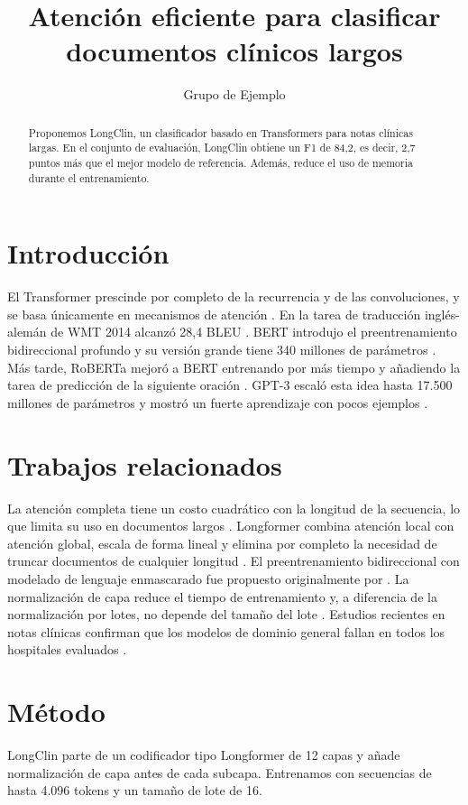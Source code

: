 \documentclass{article}
\title{Atención eficiente para clasificar documentos clínicos largos}
\author{Grupo de Ejemplo}
\begin{document}
\maketitle

\begin{abstract}
Proponemos LongClin, un clasificador basado en Transformers para notas clínicas largas.
En el conjunto de evaluación, LongClin obtiene un F1 de 84,2, es decir, 2,7 puntos más que el mejor modelo de referencia.
Además, reduce el uso de memoria durante el entrenamiento.
\end{abstract}

\section{Introducción}
El Transformer prescinde por completo de la recurrencia y de las convoluciones, y se basa únicamente en mecanismos de atención \cite{vaswani2017}.
En la tarea de traducción inglés-alemán de WMT 2014 alcanzó 28,4 BLEU \cite{vaswani2017}.
BERT introdujo el preentrenamiento bidireccional profundo y su versión grande tiene 340 millones de parámetros \cite{devlin2019}.
Más tarde, RoBERTa mejoró a BERT entrenando por más tiempo y añadiendo la tarea de predicción de la siguiente oración \cite{liu2019}.
GPT-3 escaló esta idea hasta 17.500 millones de parámetros y mostró un fuerte aprendizaje con pocos ejemplos \cite{brown2020}.

\section{Trabajos relacionados}
La atención completa tiene un costo cuadrático con la longitud de la secuencia, lo que limita su uso en documentos largos \cite{beltagy2020}.
Longformer combina atención local con atención global, escala de forma lineal y elimina por completo la necesidad de truncar documentos de cualquier longitud \cite{beltagy2020}.
El preentrenamiento bidireccional con modelado de lenguaje enmascarado fue propuesto originalmente por \cite{vaswani2017}.
La normalización de capa reduce el tiempo de entrenamiento y, a diferencia de la normalización por lotes, no depende del tamaño del lote \cite{ba2016}.
Estudios recientes en notas clínicas confirman que los modelos de dominio general fallan en todos los hospitales evaluados \cite{gomez2023}.

\section{Método}
LongClin parte de un codificador tipo Longformer de 12 capas y añade normalización de capa antes de cada subcapa.
Entrenamos con secuencias de hasta 4.096 tokens y un tamaño de lote de 16.
\end{document}
